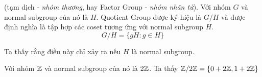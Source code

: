 \begin{definition}
    (tạm dịch - \textit{nhóm thương}, hay Factor Group - \textit{nhóm nhân tử}). Với nhóm $G$ và normal subgroup của nó là $H$.
    Quotient Group được ký hiệu là $G / H$ và được định nghĩa là tập hợp các coset tương ứng với normal subgroup $H$.
    \[G / H = \{gH : g \in H \}\]

    Ta thấy rằng điều này chỉ xảy ra nếu $H$ là normal subgroup.
\end{definition}

\begin{example}
    Với nhóm $\mathbb{Z}$ và normal subgroup của nó là $2\mathbb{Z}$.
    Ta thấy $\mathbb{Z} / 2 \mathbb{Z} = \{0 + 2 \mathbb{Z}, 1 + 2 \mathbb{Z}\}$
\end{example}